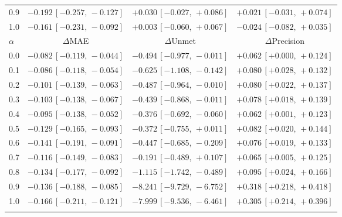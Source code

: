 \documentclass[pdflatex,sn-nature]{sn-jnl}
\begin{document}
\begin{table}[h]
\begin{tabular}{@{}lccc@{}}
0.9 & $\mathbf{-0.192}\,[-0.257,\,-0.127]$ & $+0.030\,[-0.027,\,+0.086]$ & $+0.021\,[-0.031,\,+0.074]$ \\
1.0 & $\mathbf{-0.161}\,[-0.231,\,-0.092]$ & $+0.003\,[-0.060,\,+0.067]$ & $-0.024\,[-0.082,\,+0.035]$ \\
\midrule
$\alpha$ & $\Delta$MAE & $\Delta$Unmet & $\Delta$Precision \\
\midrule
0.0 & $\mathbf{-0.082}\,[-0.119,\,-0.044]$ & $\mathbf{-0.494}\,[-0.977,\,-0.011]$ & $\mathbf{+0.062}\,[+0.000,\,+0.124]$ \\
0.1 & $\mathbf{-0.086}\,[-0.118,\,-0.054]$ & $\mathbf{-0.625}\,[-1.108,\,-0.142]$ & $\mathbf{+0.080}\,[+0.028,\,+0.132]$ \\
0.2 & $\mathbf{-0.101}\,[-0.139,\,-0.063]$ & $\mathbf{-0.487}\,[-0.964,\,-0.010]$ & $\mathbf{+0.080}\,[+0.022,\,+0.137]$ \\
0.3 & $\mathbf{-0.103}\,[-0.138,\,-0.067]$ & $\mathbf{-0.439}\,[-0.868,\,-0.011]$ & $\mathbf{+0.078}\,[+0.018,\,+0.139]$ \\
0.4 & $\mathbf{-0.095}\,[-0.138,\,-0.052]$ & $\mathbf{-0.376}\,[-0.692,\,-0.060]$ & $\mathbf{+0.062}\,[+0.001,\,+0.123]$ \\
0.5 & $\mathbf{-0.129}\,[-0.165,\,-0.093]$ & $-0.372\,[-0.755,\,+0.011]$ & $\mathbf{+0.082}\,[+0.020,\,+0.144]$ \\
0.6 & $\mathbf{-0.141}\,[-0.191,\,-0.091]$ & $\mathbf{-0.447}\,[-0.685,\,-0.209]$ & $\mathbf{+0.076}\,[+0.019,\,+0.133]$ \\
0.7 & $\mathbf{-0.116}\,[-0.149,\,-0.083]$ & $-0.191\,[-0.489,\,+0.107]$ & $\mathbf{+0.065}\,[+0.005,\,+0.125]$ \\
0.8 & $\mathbf{-0.134}\,[-0.177,\,-0.092]$ & $\mathbf{-1.115}\,[-1.742,\,-0.489]$ & $\mathbf{+0.095}\,[+0.024,\,+0.166]$ \\
0.9 & $\mathbf{-0.136}\,[-0.188,\,-0.085]$ & $\mathbf{-8.241}\,[-9.729,\,-6.752]$ & $\mathbf{+0.318}\,[+0.218,\,+0.418]$ \\
1.0 & $\mathbf{-0.166}\,[-0.211,\,-0.121]$ & $\mathbf{-7.999}\,[-9.536,\,-6.461]$ & $\mathbf{+0.305}\,[+0.214,\,+0.396]$ \\
\botrule
\end{tabular}
\end{table}
\end{document}
